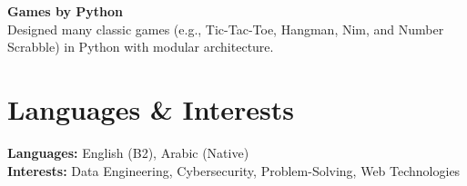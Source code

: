 \textbf{Games by Python}  \\
\textbullet{}\hspace{2mm} Designed many classic games (e.g., Tic-Tac-Toe, Hangman, Nim, and Number Scrabble) in Python with modular architecture.


\section*{Languages \& Interests}
\textbf{Languages:} English (B2), Arabic (Native) \\
\textbf{Interests:} Data Engineering, Cybersecurity, Problem-Solving, Web Technologies


